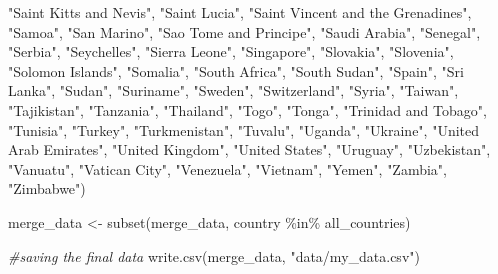 \documentclass[
]{article}
\newenvironment{Shaded}{\begin{snugshade}}{\end{snugshade}}
\newcommand{\CommentTok}[1]{\textcolor[rgb]{0.56,0.35,0.01}{\textit{#1}}}
\newcommand{\FunctionTok}[1]{\textcolor[rgb]{0.00,0.00,0.00}{#1}}
\newcommand{\NormalTok}[1]{#1}
\newcommand{\OtherTok}[1]{\textcolor[rgb]{0.56,0.35,0.01}{#1}}
\newcommand{\SpecialCharTok}[1]{\textcolor[rgb]{0.00,0.00,0.00}{#1}}
\newcommand{\StringTok}[1]{\textcolor[rgb]{0.31,0.60,0.02}{#1}}
\begin{document}
\begin{Shaded}
\begin{Highlighting}[]
    \StringTok{"Saint Kitts and Nevis"}\NormalTok{, }\StringTok{"Saint Lucia"}\NormalTok{, }\StringTok{"Saint Vincent and the Grenadines"}\NormalTok{, }\StringTok{"Samoa"}\NormalTok{,}
    \StringTok{"San Marino"}\NormalTok{, }\StringTok{"Sao Tome and Principe"}\NormalTok{, }\StringTok{"Saudi Arabia"}\NormalTok{, }\StringTok{"Senegal"}\NormalTok{, }\StringTok{"Serbia"}\NormalTok{, }\StringTok{"Seychelles"}\NormalTok{,}
    \StringTok{"Sierra Leone"}\NormalTok{, }\StringTok{"Singapore"}\NormalTok{, }\StringTok{"Slovakia"}\NormalTok{, }\StringTok{"Slovenia"}\NormalTok{, }\StringTok{"Solomon Islands"}\NormalTok{, }\StringTok{"Somalia"}\NormalTok{,}
    \StringTok{"South Africa"}\NormalTok{, }\StringTok{"South Sudan"}\NormalTok{, }\StringTok{"Spain"}\NormalTok{, }\StringTok{"Sri Lanka"}\NormalTok{, }\StringTok{"Sudan"}\NormalTok{, }\StringTok{"Suriname"}\NormalTok{, }\StringTok{"Sweden"}\NormalTok{,}
    \StringTok{"Switzerland"}\NormalTok{, }\StringTok{"Syria"}\NormalTok{, }\StringTok{"Taiwan"}\NormalTok{, }\StringTok{"Tajikistan"}\NormalTok{, }\StringTok{"Tanzania"}\NormalTok{, }\StringTok{"Thailand"}\NormalTok{, }\StringTok{"Togo"}\NormalTok{,}
    \StringTok{"Tonga"}\NormalTok{, }\StringTok{"Trinidad and Tobago"}\NormalTok{, }\StringTok{"Tunisia"}\NormalTok{, }\StringTok{"Turkey"}\NormalTok{, }\StringTok{"Turkmenistan"}\NormalTok{, }\StringTok{"Tuvalu"}\NormalTok{,}
    \StringTok{"Uganda"}\NormalTok{, }\StringTok{"Ukraine"}\NormalTok{, }\StringTok{"United Arab Emirates"}\NormalTok{, }\StringTok{"United Kingdom"}\NormalTok{, }\StringTok{"United States"}\NormalTok{,}
    \StringTok{"Uruguay"}\NormalTok{, }\StringTok{"Uzbekistan"}\NormalTok{, }\StringTok{"Vanuatu"}\NormalTok{, }\StringTok{"Vatican City"}\NormalTok{, }\StringTok{"Venezuela"}\NormalTok{, }\StringTok{"Vietnam"}\NormalTok{,}
    \StringTok{"Yemen"}\NormalTok{, }\StringTok{"Zambia"}\NormalTok{, }\StringTok{"Zimbabwe"}\NormalTok{)}

\NormalTok{merge\_data }\OtherTok{\textless{}{-}} \FunctionTok{subset}\NormalTok{(merge\_data, country }\SpecialCharTok{\%in\%}\NormalTok{ all\_countries)}
\end{Highlighting}
\end{Shaded}

\begin{Shaded}
\begin{Highlighting}[]
\CommentTok{\#saving the final data}
\FunctionTok{write.csv}\NormalTok{(merge\_data, }\StringTok{"data/my\_data.csv"}\NormalTok{)}
\end{Highlighting}
\end{Shaded}
\end{document}
